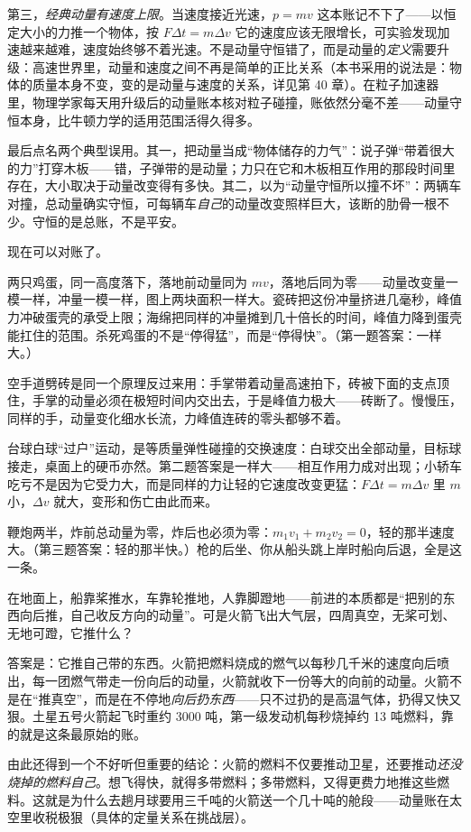 第三，\emph{经典动量有速度上限}。当速度接近光速，\(p=mv\) 这本账记不下了——以恒定大小的力推一个物体，按 \(F\Delta t=m\Delta v\) 它的速度应该无限增长，可实验发现加速越来越难，速度始终够不着光速。不是动量守恒错了，而是动量的\emph{定义}需要升级：高速世界里，动量和速度之间不再是简单的正比关系（本书采用的说法是：物体的质量本身不变，变的是动量与速度的关系，详见第 40 章）。在粒子加速器里，物理学家每天用升级后的动量账本核对粒子碰撞，账依然分毫不差——动量守恒本身，比牛顿力学的适用范围活得久得多。

最后点名两个典型误用。其一，把动量当成“物体储存的力气”：说子弹“带着很大的力”打穿木板——错，子弹带的是动量；力只在它和木板相互作用的那段时间里存在，大小取决于动量改变得有多快。其二，以为“动量守恒所以撞不坏”：两辆车对撞，总动量确实守恒，可每辆车\emph{自己}的动量改变照样巨大，该断的肋骨一根不少。守恒的是总账，不是平安。


现在可以对账了。

两只鸡蛋，同一高度落下，落地前动量同为 \(mv\)，落地后同为零——动量改变量一模一样，冲量一模一样，图上两块面积一样大。瓷砖把这份冲量挤进几毫秒，峰值力冲破蛋壳的承受上限；海绵把同样的冲量摊到几十倍长的时间，峰值力降到蛋壳能扛住的范围。杀死鸡蛋的不是“停得猛”，而是“停得快”。（第一题答案：一样大。）

空手道劈砖是同一个原理反过来用：手掌带着动量高速拍下，砖被下面的支点顶住，手掌的动量必须在极短时间内交出去，于是峰值力极大——砖断了。慢慢压，同样的手，动量变化细水长流，力峰值连砖的零头都够不着。

台球白球“过户”运动，是等质量弹性碰撞的交换速度：白球交出全部动量，目标球接走，桌面上的硬币亦然。第二题答案是一样大——相互作用力成对出现；小轿车吃亏不是因为它受力大，而是同样的力让轻的它速度改变更猛：\(F\Delta t=m\Delta v\) 里 \(m\) 小，\(\Delta v\) 就大，变形和伤亡由此而来。

鞭炮两半，炸前总动量为零，炸后也必须为零：\(m_1v_1+m_2v_2=0\)，轻的那半速度大。（第三题答案：轻的那半快。）枪的后坐、你从船头跳上岸时船向后退，全是这一条。


\begin{thought}
在地面上，船靠桨推水，车靠轮推地，人靠脚蹬地——前进的本质都是“把别的东西向后推，自己收反方向的动量”。可是火箭飞出大气层，四周真空，无桨可划、无地可蹬，它推什么？

答案是：它推自己带的东西。火箭把燃料烧成的燃气以每秒几千米的速度向后喷出，每一团燃气带走一份向后的动量，火箭就收下一份等大的向前的动量。火箭不是在“推真空”，而是在不停地\emph{向后扔东西}——只不过扔的是高温气体，扔得又快又狠。土星五号火箭起飞时重约 3000 吨，第一级发动机每秒烧掉约 13 吨燃料，靠的就是这条最原始的账。

由此还得到一个不好听但重要的结论：火箭的燃料不仅要推动卫星，还要推动\emph{还没烧掉的燃料自己}。想飞得快，就得多带燃料；多带燃料，又得更费力地推这些燃料。这就是为什么去趟月球要用三千吨的火箭送一个几十吨的舱段——动量账在太空里收税极狠（具体的定量关系在挑战层）。
\end{thought}

